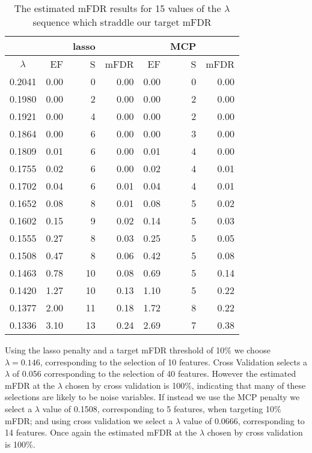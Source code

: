 \begin{table}[ht]
\centering
\begin{tabular}{c|rrr|rrr}
  \hline
 & & lasso & & & MCP & \\
 \hline
$\lambda$ & EF & S & mFDR & EF & S & mFDR \\ 
  \hline
0.2041 & 0.00 &   0 & 0.00 & 0.00 &   0 & 0.00 \\ 
  0.1980 & 0.00 &   2 & 0.00 & 0.00 &   2 & 0.00 \\ 
  0.1921 & 0.00 &   4 & 0.00 & 0.00 &   2 & 0.00 \\ 
  0.1864 & 0.00 &   6 & 0.00 & 0.00 &   3 & 0.00 \\ 
  0.1809 & 0.01 &   6 & 0.00 & 0.01 &   4 & 0.00 \\ 
  0.1755 & 0.02 &   6 & 0.00 & 0.02 &   4 & 0.01 \\ 
  0.1702 & 0.04 &   6 & 0.01 & 0.04 &   4 & 0.01 \\ 
  0.1652 & 0.08 &   8 & 0.01 & 0.08 &   5 & 0.02 \\ 
  0.1602 & 0.15 &   9 & 0.02 & 0.14 &   5 & 0.03 \\ 
  0.1555 & 0.27 &   8 & 0.03 & 0.25 &   5 & 0.05 \\ 
  0.1508 & 0.47 &   8 & 0.06 & 0.42 &   5 & 0.08 \\ 
  0.1463 & 0.78 &  10 & 0.08 & 0.69 &   5 & 0.14 \\ 
  0.1420 & 1.27 &  10 & 0.13 & 1.10 &   5 & 0.22 \\ 
  0.1377 & 2.00 &  11 & 0.18 & 1.72 &   8 & 0.22 \\ 
  0.1336 & 3.10 &  13 & 0.24 & 2.69 &   7 & 0.38 \\ 
   \hline
\end{tabular}
 \caption{The estimated mFDR results for 15 values of the $\lambda$ sequence which straddle our target mFDR}
\end{table}

Using the lasso penalty and a target mFDR threshold of 10\% we choose $\lambda = 0.146$, corresponding to the selection of 10 features.  Cross Validation selects a $\lambda$ of 0.056 corresponding to the selection of 40 features. However the estimated mFDR at the $\lambda$ chosen by cross validation is 100\%, indicating that many of these selections are likely to be noise variables. If instead we use the MCP penalty we select a $\lambda$ value of 0.1508, corresponding to 5 features, when targeting 10\% mFDR; and using cross validation we select a $\lambda$ value of 0.0666, corresponding to 14 features. Once again the estimated mFDR at the $\lambda$ chosen by cross validation is 100\%.  

